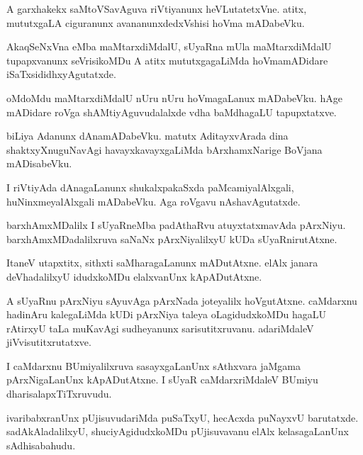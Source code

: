 \documentclass{article}
\begin{document}
\begin{mng}%
A garxhakekx saMtoVSavAguva riVtiyanunx heVLutatetxVne. atitx, mututxgaLA ciguranunx 
avananunxdedxVshisi hoVma mADabeVku.
\end{mng}

\begin{mng}%
AkaqSeNxVna eMba maMtarxdiMdalU, sUyaRna mUla maMtarxdiMdalU tupapxvanunx seVrisikoMDu A atitx 
mututxgagaLiMda hoVmamADidare iSaTxsididhxyAgutatxde.
\end{mng}

\begin{mng}%
oMdoMdu maMtarxdiMdalU nUru nUru hoVmagaLanux mADabeVku. hAge mADidare roVga shAMtiyAguvudalalxde 
vdha baMdhagaLU tapupxtatxve.
\end{mng}

\begin{mng}%
biLiya Adanunx dAnamADabeVku. matutx AditayxvArada dina shaktxyXnuguNavAgi havayxkavayxgaLiMda 
bArxhamxNarige BoVjana mADisabeVku.
\end{mng}

\begin{mng}%
I riVtiyAda dAnagaLanunx shukalxpakaSxda paMcamiyalAlxgali, huNinxmeyalAlxgali mADabeVku. Aga 
roVgavu nAshavAgutatxde.
\end{mng}

\begin{mng}%
barxhAmxMDalilx I sUyaRneMba padAthaRvu atuyxtatxmavAda pArxNiyu. barxhAmxMDadalilxruva saNaNx 
pArxNiyalilxyU kUDa sUyaRnirutAtxne.
\end{mng}

\begin{mng}%
ItaneV utapxtitx, sithxti saMharagaLanunx mADutAtxne. elAlx janara deVhadalilxyU idudxkoMDu 
elalxvanUnx kApADutAtxne.
\end{mng}

\begin{mng}%
A sUyaRnu pArxNiyu sAyuvAga pArxNada joteyalilx hoVgutAtxne. caMdarxnu hadinAru kalegaLiMda kUDi 
pArxNiya taleya oLagidudxkoMDu hagaLU rAtirxyU taLa muKavAgi sudheyanunx sarisutitxruvanu. 
adariMdaleV jiVvisutitxrutatxve.
\end{mng}

\begin{mng}%
I caMdarxnu BUmiyalilxruva sasayxgaLanUnx sAthxvara jaMgama pArxNigaLanUnx kApADutAtxne. I sUyaR 
caMdarxriMdaleV BUmiyu dharisalapxTiTxruvudu.
\end{mng}

\begin{mng}%
ivaribabxranUnx pUjisuvudariMda puSaTxyU, hecAcxda puNayxvU barutatxde. sadAkAladalilxyU, 
shuciyAgidudxkoMDu pUjisuvavanu elAlx kelasagaLanUnx sAdhisabahudu.
\end{mng}
\end{document}
